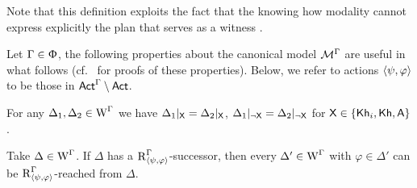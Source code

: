 Note that this definition exploits the fact that the knowing how modality cannot express explicitly the plan that serves as a witness .


Let $\Gamma \in \Upphi$, the following properties about the canonical model $\mathcal{M}^\Gamma$ are useful in what follows (cf.~\cite{Wang2016,AFSVQ23report} for proofs of these properties). Below, we refer to actions $\langle \psi,\varphi \rangle$ to be those in ${\rm \sf Act}^\Gamma\setminus{\rm \sf Act}$.

\medskip

\begin{proposition}\label{pro:cm-ults-khiml-allsame}
For any $\Delta_1, \Delta_2 \in \operatorname{W}^\Gamma$ we have $\Delta_1|_{{\mathsf{X}}} = \Delta_2|_{{\mathsf{X}}}$, $\Delta_1|_{\lnot{\mathsf{X}}} = \Delta_2|_{\lnot{\mathsf{X}}}$ for ${\mathsf{X}} \in \{ {\sf Kh}_i,{\sf Kh},{\sf A} \}$.
\end{proposition}

\medskip

\begin{proposition}\label{pro:cm-ults-khiml-oneall}
Take $\Delta \in \operatorname{W}^\Gamma$. If $\Delta$ has a $\operatorname{R}^\Gamma_{\langle \psi,\varphi \rangle}$-successor, then every $\Delta' \in \operatorname{W}^\Gamma$ with $\varphi \in \Delta'$ can be $\operatorname{R}^\Gamma_{\langle \psi,\varphi \rangle}$-reached from $\Delta$.
\end{proposition}

